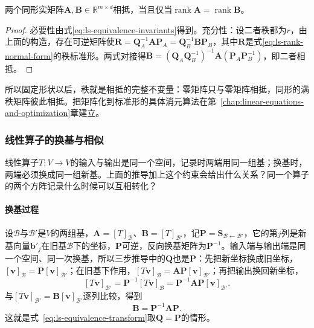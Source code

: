 \begin{theorem}[相抵判据]
\label{thm:ls-equivalence-criterion}
两个同形实矩阵$\bm A,\bm B\in\mathbb R^{m\times d}$相抵，当且仅当$\operatorname{rank}\bm A=\operatorname{rank}\bm B$。
\end{theorem}
\begin{proof}
必要性由式\eqref{eq:ls-equivalence-invariants}得到。充分性：设二者秩都为$r$，由上面的构造，存在可逆矩阵使$\bm R=\bm Q_A^{-1}\bm A\bm P_A=\bm Q_B^{-1}\bm B\bm P_B$，其中$\bm R$是式\eqref{eq:ls-rank-normal-form}的秩标准形。两式对接得$\bm B=(\bm Q_A\bm Q_B^{-1})^{-1}\bm A(\bm P_A\bm P_B^{-1})$，即二者相抵。
\end{proof}
所以固定形状以后，秩就是相抵的完整不变量：零矩阵只与零矩阵相抵，同形的满秩矩阵彼此相抵。把矩阵化到标准形的具体消元算法在第~\ref{chap:linear-equations-and-optimization}章建立。

\subsubsection{线性算子的换基与相似}
\label{sec:ls-similarity}
\label{sec:ls-matrix-equivalences}

线性算子$T:V\to V$的输入与输出是同一个空间，记录时两端用同一组基；换基时，两端必须换成同一组新基。上面的推导加上这个约束会给出什么关系？同一个算子的两个方阵记录什么时候可以互相转化？

\paragraph{换基过程}
设$\mathcal B$与$\mathcal B'$是$V$的两组基，$\bm A=[T]_{\mathcal B}$、$\bm B=[T]_{\mathcal B'}$，记$\bm P=\bm S_{\mathcal B\leftarrow\mathcal B'}$，它的第$j$列是新基向量$\bm b'_j$在旧基$\mathcal B$下的坐标，$\bm P$可逆，反向换基矩阵为$\bm P^{-1}$。输入端与输出端是同一个空间、同一次换基，所以三步推导中的$\bm Q$也是$\bm P$：先把新坐标换成旧坐标，$[\bm v]_{\mathcal B}=\bm P[\bm v]_{\mathcal B'}$；在旧基下作用，$[T\bm v]_{\mathcal B}=\bm A\bm P[\bm v]_{\mathcal B'}$；再把输出换回新坐标，
\[
 [T\bm v]_{\mathcal B'}=\bm P^{-1}[T\bm v]_{\mathcal B}=\bm P^{-1}\bm A\bm P[\bm v]_{\mathcal B'}.
\]
与$[T\bm v]_{\mathcal B'}=\bm B[\bm v]_{\mathcal B'}$逐列比较，得到
\begin{equation}
 \bm B=\bm P^{-1}\bm A\bm P.
 \label{eq:linear-algebra-similarity-change-basis}
\end{equation}
这就是式~\eqref{eq:ls-equivalence-transform}取$\bm Q=\bm P$的情形。

